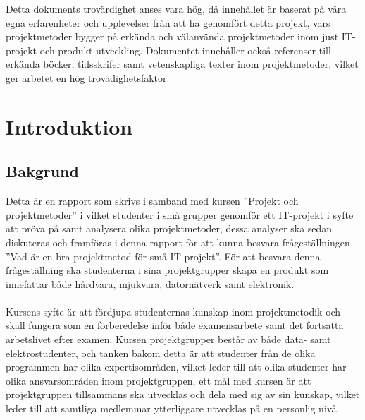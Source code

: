 \documentclass[conference]{IEEEtran}
\begin{document}
Detta dokuments trovärdighet anses vara hög, då innehållet är baserat på våra egna erfarenheter och upplevelser från att ha genomfört detta projekt, vars projektmetoder bygger på erkända och välanvända projektmetoder inom just IT-projekt och produkt-utveckling. Dokumentet innehåller också referenser till  erkända böcker, tidsskrifer samt vetenskapliga texter inom projektmetoder, vilket ger arbetet en hög trovädighetsfaktor.
\section{Introduktion}

 

\subsection{Bakgrund}
Detta är en rapport som skrivs i samband med kursen ''Projekt och projektmetoder'' i vilket studenter i små grupper genomför ett IT-projekt i syfte att pröva på samt analysera olika projektmetoder, dessa analyser ska sedan diskuteras och framföras i denna rapport för att kunna besvara frågeställningen ''Vad är en bra projektmetod för små IT-projekt''. För att besvara denna frågeställning ska studenterna i sina projektgrupper skapa en produkt som innefattar både hårdvara, mjukvara, datornätverk samt elektronik.\\
\\
Kursens syfte är att fördjupa studenternas kunskap inom projektmetodik och skall fungera som en förberedelse inför både examensarbete samt det fortsatta arbetslivet efter examen. Kursen projektgrupper består av både data- samt elektrostudenter, och tanken bakom detta är att studenter från de olika programmen har olika expertisområden, vilket leder till att olika studenter har olika ansvarsområden inom projektgruppen, ett mål med kursen är att projektgruppen tillsammans ska utvecklas och dela med sig av sin kunskap, vilket leder till att samtliga medlemmar ytterliggare utvecklas på en personlig nivå.
\end{document}
